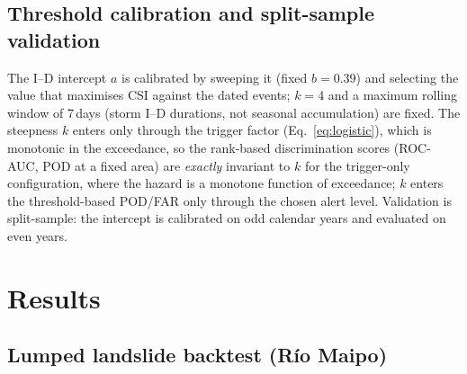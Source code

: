 \documentclass[authoryear,preprint,review,12pt]{elsarticle}
\begin{document}
\subsection{Threshold calibration and split-sample validation}

The I--D intercept $a$ is calibrated by sweeping it (fixed $b=0.39$) and selecting
the value that maximises CSI against the dated events; $k=4$ and a maximum rolling
window of 7\,days (storm I--D durations, not seasonal accumulation) are fixed.
The steepness $k$ enters only through the trigger factor (Eq.~\ref{eq:logistic}),
which is monotonic in the exceedance, so the rank-based discrimination scores
(ROC-AUC, POD at a fixed area) are \emph{exactly} invariant to $k$ for the
trigger-only configuration, where the hazard is a monotone function of exceedance;
$k$ enters the threshold-based POD/FAR only through the chosen alert level.
Validation is split-sample: the intercept is calibrated on odd calendar years and
evaluated on even years.

\section{Results}

\subsection{Lumped landslide backtest (R\'io Maipo)}
\label{sec:lumped}
\end{document}
